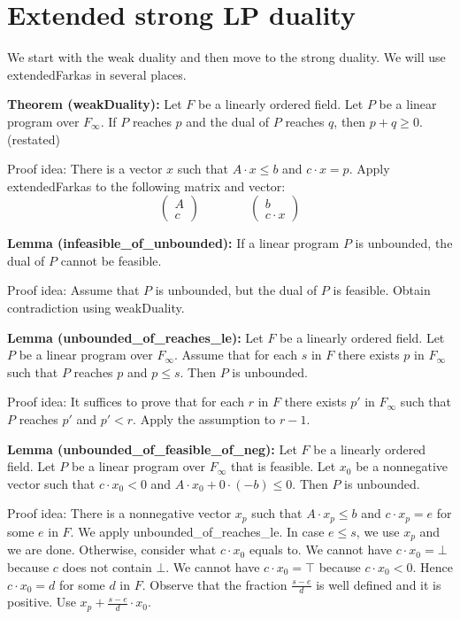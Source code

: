 \documentclass[]{article}
\renewcommand{\.}{\hskip .75pt}
\let\*=\cdot
\begin{document}
\section {Extended strong LP duality}
\label{duality}

We start with the weak duality and then move to the strong duality.
We will use extendedFarkas in several places.

\medskip \noindent
\textbf{Theorem (weakDuality):}
Let $F$ be a linearly ordered field.
Let $P$ be a linear program over $F_\infty$.
If $P$ reaches $p$ and the dual of $P$ reaches $q$,
then $p + q \ge 0$.
(restated)

\medskip \noindent
Proof idea:
There is a vector $x$ such that $A \* x \le b$ and $c \* x = p$.
Apply extendedFarkas to the following matrix and vector:
$$
\begin{pmatrix}
A \\
c
\end{pmatrix}
\qquad \qquad
\begin{pmatrix}
b \\
c \* x
\end{pmatrix}
$$


\medskip \noindent
\textbf{Lemma (infeasible\_of\_unbounded):}
If a linear program $P$ is unbounded,
the dual of $P$ cannot be feasible.

\medskip \noindent
Proof idea:
Assume that $P$ is unbounded, but the dual of $P$ is feasible.
Obtain contradiction using weakDuality.

\medskip \noindent
\textbf{Lemma (unbounded\_of\_reaches\_le):}
Let $F$ be a linearly ordered field.
Let $P$ be a linear program over $F_\infty$.
Assume that for each $s$ in $F$ there exists
$p$ in $F_\infty$ such that $P$ reaches $p$
and $p \le s$.
Then $P$ is unbounded.

\medskip \noindent
Proof idea:
It suffices to prove that for each $r$ in $F$ there exists
$p'$ in $F_\infty$ such that $P$ reaches $p'$ and $p' < r$.
Apply the assumption to $r\!-\!1$.

\medskip \noindent
\textbf{Lemma (unbounded\_of\_feasible\_of\_neg):}
Let $F$ be a linearly ordered field.
Let $P$ be a linear program over $F_\infty$ that is feasible.
Let $x_0$ be a nonnegative vector such that $c \cdot x_0 < 0$
and $A \cdot x_0 + 0 \cdot (-b) \le 0$.
Then $P$ is unbounded.

\medskip \noindent
Proof idea:
There is a nonnegative vector $x_p$ such that $A \* x_p \le b$ and
$c \* x_p = e$ for some $e$ in $F$.
We apply unbounded\_of\_reaches\_le.
In case $e \le s$, we use $x_p$ and we are done.
Otherwise, consider what $c \cdot x_0$ equals to.
We cannot have $c \cdot x_0 = \bot$ because $c$ does not contain $\bot$.
We cannot have $c \cdot x_0 = \top$ because $c \cdot x_0 < 0$.
Hence $c \cdot x_0 = d$ for some $d$ in $F$.
Observe that the fraction $\frac{s-e}{d}$ is
well defined and it is positive.
Use $x_p + \frac{s-e}{d} \cdot x_0$.
\end{document}
